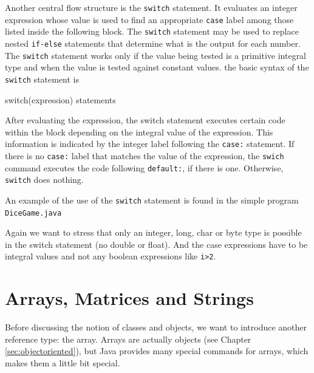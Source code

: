 Another central flow structure is the \verb|switch| statement. It
evaluates an integer expression whose value is used to find an
appropriate \verb|case| label among those listed inside the following
block. The \verb|switch| statement may be used to replace nested \verb|if-else|
statements that determine what is the output for each number. The
\verb|switch| statement works only if the value being tested is a
primitive integral type and when the value is tested against constant
values. the basic syntax of the \verb|switch| statement is
\begin{sverbatim}
switch(expression) {
    statements
}
\end{sverbatim}
After evaluating the expression, the switch statement executes
certain code within the block depending on the integral value of the
expression. This information is indicated by the integer label following
the \verb|case:| statement. If there is no \verb|case:| label that
matches the value of the expression, the \verb|swich| command executes
the code following \verb|default:|, if there is one. Otherwise,
\verb|switch| does nothing.

An example of the use of the \verb|switch| statement is found in the
simple program \verb|DiceGame.java| 


Again we want to stress that only an integer, long, char or byte type
is possible in the switch statement (no double or float). And the
case expressions have to be integral values and not any boolean
expressions like \verb|i>2|. 


\section{Arrays, Matrices and Strings}
\label{sec:Arrays}

Before discussing the notion of classes and objects, we want to introduce
another reference type: the array. Arrays are actually objects
(see Chapter \ref{sec:objectoriented}), but
Java provides many special commands for arrays, which makes them a 
little bit special.

